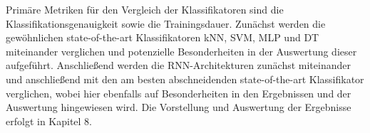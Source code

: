 Primäre Metriken für den Vergleich der Klassifikatoren sind die Klassifikationsgenauigkeit sowie die Trainingsdauer. Zunächst werden die gewöhnlichen state-of-the-art Klassifikatoren kNN, SVM, MLP und DT miteinander verglichen und potenzielle Besonderheiten in der Auswertung dieser aufgeführt. Anschließend werden die RNN-Architekturen zunächst miteinander und anschließend mit den am besten abschneidenden state-of-the-art Klassifikator verglichen, wobei hier ebenfalls auf Besonderheiten in den Ergebnissen und der Auswertung hingewiesen wird. Die Vorstellung und Auswertung der Ergebnisse erfolgt in Kapitel 8.